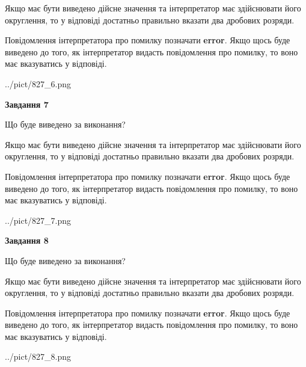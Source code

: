 \documentclass[12pt, ukrainian]{article}
\begin{document}
{\begin {Large}
Якщо має бути виведено дійсне значення та інтерпретатор має здійснювати його округлення, 
то у відповіді достатньо правильно вказати два дробових розряди.

Повідомлення інтерпретатора про помилку позначати \textbf{error}.
Якщо щось буде виведено до того, як інтерпретатор видасть повідомлення про помилку, 
то воно має вказуватись у відповіді. \par

\begin{center}
	{../pict/827_6.png}
\end{center}
\newpage

{\begin {center}\textbf{Завдання 7}\end {center}}\par
Що буде виведено за виконання? \par

Якщо має бути виведено дійсне значення та інтерпретатор має здійснювати його округлення, 
то у відповіді достатньо правильно вказати два дробових розряди.

Повідомлення інтерпретатора про помилку позначати \textbf{error}.
Якщо щось буде виведено до того, як інтерпретатор видасть повідомлення про помилку, 
то воно має вказуватись у відповіді. \par

\begin{center}
	{../pict/827_7.png}
\end{center}
\newpage

{\begin {center}\textbf{Завдання 8}\end {center}}\par
Що буде виведено за виконання? \par

Якщо має бути виведено дійсне значення та інтерпретатор має здійснювати його округлення, 
то у відповіді достатньо правильно вказати два дробових розряди.

Повідомлення інтерпретатора про помилку позначати \textbf{error}.
Якщо щось буде виведено до того, як інтерпретатор видасть повідомлення про помилку, 
то воно має вказуватись у відповіді. \par

\begin{center}
	{../pict/827_8.png}
\end{center}
\newpage


\end{Large}}
\end{document}
